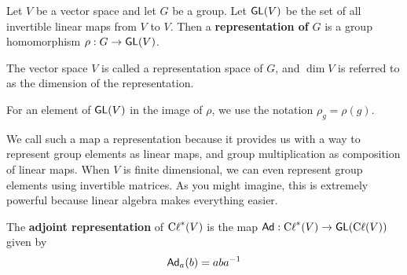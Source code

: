 \begin{defn}[Representation]
Let $V$ be a vector space and let $G$ be a group. Let $\operatorname{\textsf{GL}}(V)$ be the set of all invertible linear maps from $V$ to $V$. Then a \textbf{representation of} $G$ is a group homomorphism $\rho : G \to \operatorname{\textsf{GL}}(V)$.

The vector space $V$ is called a representation space of $G$, and $\dim V$ is referred to as the dimension of the representation.
\end{defn}
\begin{remark*}
    For an element of $\operatorname{\textsf{GL}}(V)$ in the image of $\rho$, we use the notation $\rho_g = \rho(g)$.
\end{remark*}
\begin{remark*}
    We call such a map a representation because it provides us with a way to represent group elements as linear maps, and group multiplication as composition of linear maps. When $V$ is finite dimensional, we can even represent group elements using invertible matrices. As you might imagine, this is extremely powerful because linear algebra makes everything easier.
\end{remark*}

\begin{defn}
The \textbf{adjoint representation} of $\operatorname{C\ell}^*(V)$ is the map $\operatorname{\textsf{Ad}} : \operatorname{C\ell}^*(V) \to \operatorname{\textsf{GL}}(\operatorname{C\ell}(V))$ given by 
\begin{equation}\operatorname{\textsf{Ad}}_a(b) = aba^{-1}\end{equation}
\end{defn}

